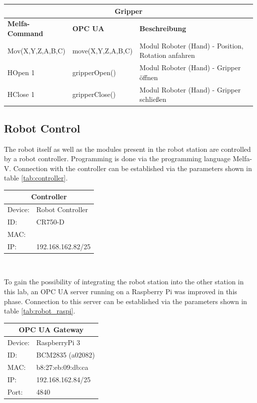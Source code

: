 \documentclass{article}
\begin{document}
\begin{center}
	\setlength\extrarowheight{4pt}
	\small
		\begin{tabularx}{\textwidth}{|p{3cm}|p{4cm}|X|}
			\hline
			\multicolumn{3}{|c|}{\bf \color{white} \large Gripper}\\
			\hline\hline
			\bf Melfa-Command & \bf OPC UA & \bf Beschreibung\\
			\hline\hline
			Mov(X,Y,Z,A,B,C) & move(X,Y,Z,A,B,C) & Modul Roboter (Hand) - Position, Rotation anfahren\\
			\hline
			HOpen 1 & gripperOpen() & Modul Roboter (Hand) - Gripper öffnen\\
			\hline
			HClose 1 & gripperClose() & Modul Roboter (Hand) - Gripper schließen\\
			\hline
		\end{tabularx}
		\label{tab:robot_ctrl}
\end{center}

\subsection{Robot Control}
The robot itself as well as the modules present in the robot station are controlled by a robot controller. Programming is done via the programming language Melfa-V. Connection with the controller can be established via the parameters shown in table \ref{tab:controller}. 
\begin{center}
		\begin{tabular}[h]{|p{1.2cm}p{5.5cm}|}
			\hline
			\multicolumn{2}{|c|}{\bf Controller}\\
			\hline\hline
			Device: & Robot Controller\\
			\hline
			ID: & CR750-D\\
			\hline
			MAC: & \\
			\hline
			IP: & 192.168.162.82/25\\
			\hline
		\end{tabular} \\
		\label{tab:controller}
\end{center}
To gain the possibility of integrating the robot station into the other station in this lab, an OPC UA server running on a Raspberry Pi was improved in this phase. Connection to this server can be established via the parameters shown in table \ref{tab:robot_raspi}.
\begin{center}
	\setlength\extrarowheight{2pt}
			\begin{tabular}[h]{|p{1.2cm}p{4.5cm}|}
			\hline
			\multicolumn{2}{|c|}{\bf OPC UA Gateway}\\
			\hline\hline
			Device: & RaspberryPi 3\\
			\hline
			ID: & BCM2835 (a02082)\\
			\hline
			MAC: & b8:27:eb:09:db:ca\\
			\hline
			IP: & 192.168.162.84/25\\
			\hline
			Port: & 4840\\
			\hline
		\end{tabular} 
		\label{tab:robot_raspi}
\end{center}
\newpage
\end{document}
